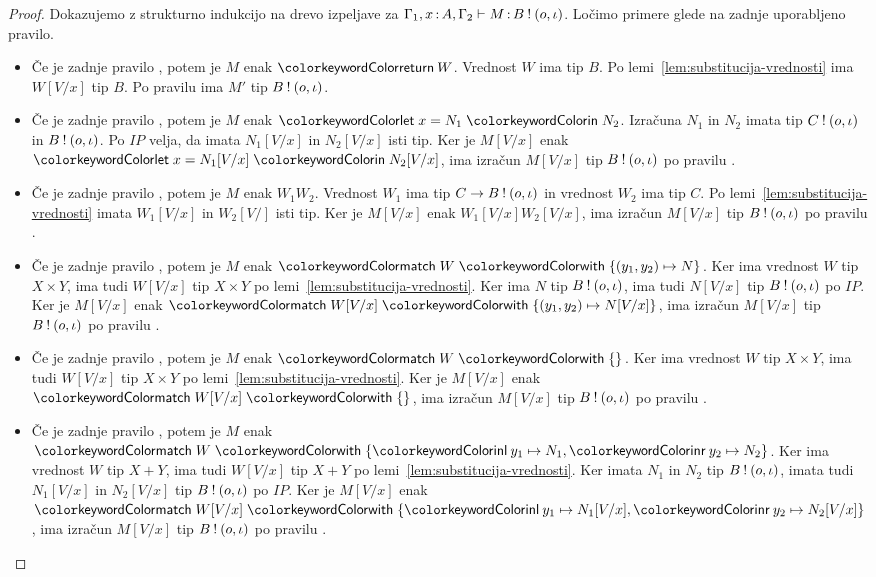 \begin{proof}
	Dokazujemo z strukturno indukcijo na drevo izpeljave za $\Gamma_1, x \mathinner{:} A, \Gamma_2 \vdash M \mathinner{:} B \mathbin{!} (o, \iota)$.
	Ločimo primere glede na zadnje uporabljeno pravilo.
	
	\begin{itemize}
		\item Če je zadnje pravilo , potem je $M$ enak $\tmreturn{W}$. Vrednost $W$ ima tip $B$. Po lemi~\ref{lem:substitucija-vrednosti} ima $W[V/x]$ tip $B$. Po pravilu  ima $M'$ tip $B \mathbin{!} (o, \iota)$.
		
		\item Če je zadnje pravilo , potem je $M$ enak $\tmlet{x}{N_1}{N_2}$. Izračuna $N_1$ in $N_2$ imata tip $C \mathbin{!} (o, \iota)$ in $B \mathbin{!} (o, \iota)$.
		Po $IP$ velja, da imata $N_1[V/x]$ in $N_2[V/x]$ isti tip. Ker je $M[V/x]$ enak $\tmlet{x}{N_1[V/x]}{N_2[V/x]}$, ima izračun $M[V/x]$ tip $B \mathbin{!} (o, \iota)$ po pravilu .
		
		\item Če je zadnje pravilo , potem je $M$ enak $W_1 W_2$. Vrednost $W_1$ ima tip $C \to B \mathbin{!} (o, \iota)$ in vrednost $W_2$ ima tip $C$.
		Po lemi~\ref{lem:substitucija-vrednosti} imata $W_1[V/x]$ in $W_2[V/]$ isti tip. Ker je $M[V/x]$ enak $W_1[V/x] W_2[V/x]$, ima izračun $M[V/x]$ tip $B \mathbin{!} (o, \iota)$ po pravilu .
		
		\item Če je zadnje pravilo , potem je $M$ enak $\tmmatch{W}{(y_1,y_2) \mapsto N}$. 
		Ker ima vrednost $W$ tip $X \times Y$, ima tudi $W[V/x]$ tip $X \times Y$ po lemi~\ref{lem:substitucija-vrednosti}.
		Ker ima $N$ tip $B \mathbin{!} (o, \iota)$, ima tudi $N[V/x]$ tip $B \mathbin{!} (o, \iota)$ po $IP$.
		Ker je $M[V/x]$ enak $\tmmatch{W[V/x]}{(y_1,y_2) \mapsto N[V/x]}$, ima izračun $M[V/x]$ tip $B \mathbin{!} (o, \iota)$ po pravilu . 
		
		\item Če je zadnje pravilo , potem je $M$ enak $\tmmatch{W}{}$.
		Ker ima vrednost $W$ tip $X \times Y$, ima tudi $W[V/x]$ tip $X \times Y$ po lemi~\ref{lem:substitucija-vrednosti}.
		Ker je $M[V/x]$ enak $\tmmatch{W[V/x]}{}$, ima izračun $M[V/x]$ tip $B \mathbin{!} (o, \iota)$ po pravilu .
		
		\item Če je zadnje pravilo , potem je $M$ enak $\tmmatch{W}{\tminl{y_1} \mapsto N_1, \tminr{y_2} \mapsto N_2}$.
		Ker ima vrednost $W$ tip $X + Y$, ima tudi $W[V/x]$ tip $X + Y$ po lemi~\ref{lem:substitucija-vrednosti}.
		Ker imata $N_1$ in $N_2$ tip $B \mathbin{!} (o, \iota)$, imata tudi $N_1[V/x]$ in $N_2[V/x]$ tip $B \mathbin{!} (o, \iota)$ po $IP$.
		Ker je $M[V/x]$ enak $\tmmatch{W[V/x]}{\tminl{y_1} \mapsto N_1[V/x], \tminr{y_2} \mapsto N_2[V/x]}$, ima izračun $M[V/x]$ tip $B \mathbin{!} (o, \iota)$ po pravilu .
		

\end{itemize}
\end{proof}
